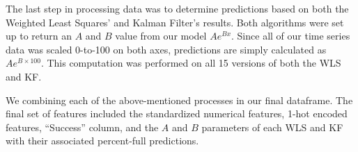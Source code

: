 The last step in processing data was to determine predictions based on both the Weighted Least Squares' and Kalman Filter's results. Both algorithms were set up to return an $A$ and $B$ value from our model $Ae^{Bx}$. Since all of our time series data was scaled 0-to-100 on both axes, predictions are simply calculated as $Ae^{B \times 100}$. This computation was performed on all 15 versions of both the WLS and KF.

We combining each of the above-mentioned processes   in our final dataframe. The final set of features included the standardized numerical features, 1-hot encoded features, ``Success'' column, and the $A$ and $B$ parameters of each WLS and KF with their associated percent-full predictions.

